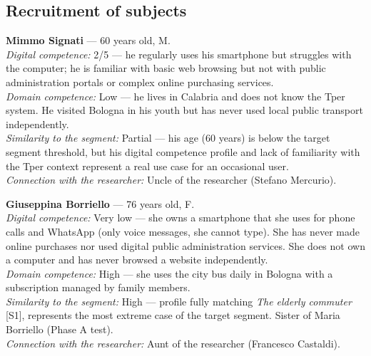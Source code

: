 ﻿\documentclass[11pt,a4paper]{article}
\begin{document}
\vspace{0.2cm}

\subsection*{Recruitment of subjects}
\begin{tcolorbox}[base]

\textbf{Mimmo Signati} --- 60 years old, M.\\[0.3cm]
\textit{Digital competence:} 2/5 --- he regularly uses his
smartphone but struggles with the computer; he is familiar
with basic web browsing but not with public administration
portals or complex online purchasing services.\\[0.2cm]
\textit{Domain competence:} Low --- he lives in Calabria and
does not know the Tper system. He visited Bologna in
his youth but has never used local public transport
independently.\\[0.2cm]
\textit{Similarity to the segment:} Partial --- his age (60
years) is below the target segment threshold,
but his digital competence profile and lack of familiarity
with the Tper context represent a real use case for
an occasional user.\\[0.2cm]
\textit{Connection with the researcher:} Uncle of the researcher
(Stefano Mercurio).

\vspace{0.2cm}

\textbf{Giuseppina Borriello} --- 76 years old, F.\\[0.3cm]
\textit{Digital competence:} Very low --- she owns a
smartphone that she uses for phone calls and WhatsApp (only
voice messages, she cannot type). She has never made
online purchases nor used digital public administration services.
She does not own a computer and has never browsed a website
independently.\\[0.2cm]
\textit{Domain competence:} High --- she uses the city bus
daily in Bologna with a subscription managed by
family members.\\[0.2cm]
\textit{Similarity to the segment:} High --- profile
fully matching \textit{The elderly commuter}
[S1], represents the most extreme case of the target segment.
Sister of Maria Borriello (Phase A test).\\[0.2cm]
\textit{Connection with the researcher:} Aunt of the researcher
(Francesco Castaldi).
\end{tcolorbox}

\vspace{0.2cm}
\end{document}
